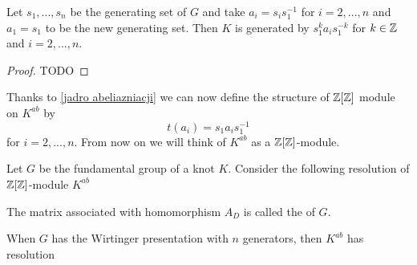 \begin{lemma}\label{jadro abeliazniacji}
  Let $s_1,..., s_n$ be the generating set of $G$ and take $a_i=s_is_1^{-1}$ for $i=2,...,n$ and $a_1=s_1$ to be the new generating set. Then $K$ is generated by $s_1^{k}a_is_1^{-k}$ for $k\in\operatorname{\mathbb{Z}}$ and $i=2,...,n$.
\end{lemma}

\begin{proof}
  {\large\color{red}TODO}
\end{proof}

Thanks to \cref{jadro abeliazniacji} we can now define the structure of $\operatorname{\mathbb{Z}}[\operatorname{\mathbb{Z}}]$ module on $K^{ab}$ by
$$t(a_i)=s_1a_is_1^{-1}$$
for $i=2,...,n$. From now on we will think of $K^{ab}$ as a $\operatorname{\mathbb{Z}}[\operatorname{\mathbb{Z}}]$-module.

\begin{definition}
  Let $G$ be the fundamental group of a knot $K$. Consider the following resolution of $\operatorname{\mathbb{Z}}[\operatorname{\mathbb{Z}}]$-module $K^{ab}$
  \begin{center}
  \end{center}
  The matrix associated with homomorphism $A_D$ is called the  of $G$.
\end{definition}

When $G$ has the Wirtinger presentation with $n$ generators, then $K^{ab}$ has resolution 
\begin{center}
\end{center}








